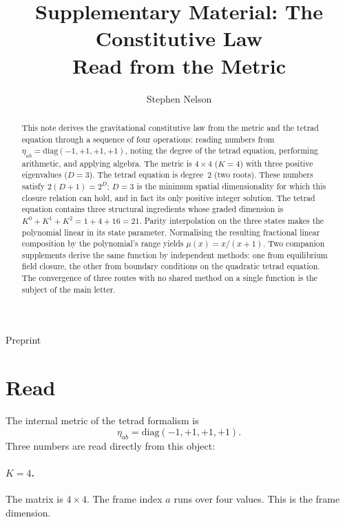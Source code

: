 \documentclass[twocolumn]{iopjournal}
\renewcommand{\articletype}[1]{%
  {\vspace*{-8mm}\noindent \Large \sf Preprint}\par
  \vspace*{6mm}\noindent{\scriptsize \sf{\bfseries \MakeUppercase{#1}}}}
\begin{document}
\articletype{Supplementary Material}

\title{Supplementary Material: The Constitutive Law\\
Read from the Metric}

\author{Stephen Nelson}



\begin{abstract}
This note derives the gravitational constitutive law from the
metric and the tetrad equation through a sequence of four
operations: reading numbers from
$\eta_{ab} = \mathrm{diag}(-1,+1,+1,+1)$, noting the degree
of the tetrad equation, performing arithmetic, and applying
algebra. The metric is $4 \times 4$ ($K = 4$) with three
positive eigenvalues ($D = 3$). The tetrad equation is degree~2
(two roots). These numbers satisfy $2(D+1) = 2^D$; $D = 3$ is
the minimum spatial dimensionality for which this closure relation
can hold, and in fact its only positive integer solution. The tetrad equation contains
three structural ingredients whose graded dimension is
$K^0 + K^1 + K^2 = 1 + 4 + 16 = 21$. Parity interpolation
on the three states makes the polynomial linear in its state
parameter. Normalising the resulting fractional linear
composition by the polynomial's range yields
$\mu(x) = x/(x+1)$. Two companion supplements derive the same
function by independent methods: one from equilibrium field
closure, the other from boundary conditions on the quadratic
tetrad equation. The convergence of three routes with no shared
method on a single function is the subject of the main letter.
\end{abstract}


\section*{Read}

The internal metric of the tetrad formalism is
\begin{equation}
  \eta_{ab} = \mathrm{diag}(-1,+1,+1,+1).
  \label{eq:eta}
\end{equation}
Three numbers are read directly from this object:

\paragraph{$K = 4$.} The matrix is $4 \times 4$. The frame
index $a$ runs over four values. This is the frame dimension.
\end{document}
